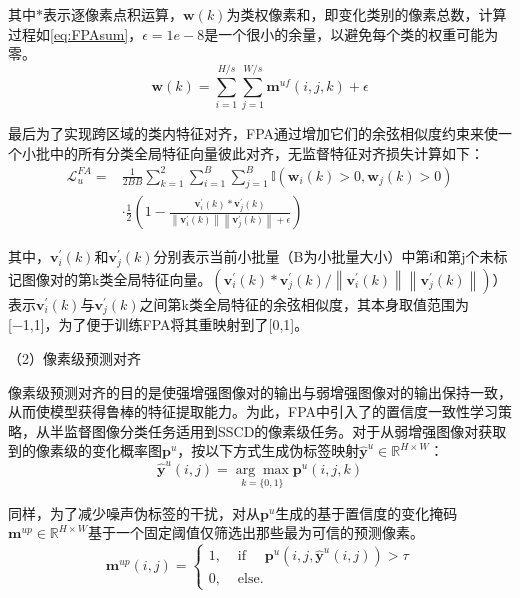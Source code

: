 \documentclass[lang=chs, degree=master, blindreview=false, adobe=false]{yanputhesis}
\begin{document}
其中$*$表示逐像素点积运算，$\boldsymbol{w}(k)$为类权像素和，即变化类别的像素总数，计算过程如\ref{eq:FPAsum}，$\epsilon = 1e-8$是一个很小的余量，以避免每个类的权重可能为零。
\begin{equation}
  \label{eq:FPAsum}
\boldsymbol{w}(k)=\sum_{i=1}^{H / s} \sum_{j=1}^{W / s} \mathbf{m}^{u f}(i, j, k)+\epsilon
\end{equation}

最后为了实现跨区域的类内特征对齐，FPA通过增加它们的余弦相似度约束来使一个小批中的所有分类全局特征向量彼此对齐，无监督特征对齐损失计算如下：
\begin{equation}
  \label{eq:FPALossf}
  \begin{aligned}
    \mathcal{L}_{u}^{F A}= & \frac{1}{2 B B} \sum_{k=1}^{2} \sum_{i=1}^{B} \sum_{j=1}^{B} \mathbb{I}\left(\boldsymbol{w}_{i}(k)>0, \boldsymbol{w}_{j}(k)>0\right) \\
    & \cdot \frac{1}{2}\left(1-\frac{\mathbf{v}_{i}^{\prime}(k) * \mathbf{v}_{j}^{\prime}(k)}{\left\|\mathbf{v}_{i}^{\prime}(k)\right\|\left\|\mathbf{v}_{j}^{\prime}(k)\right\|+\epsilon}\right)
    \end{aligned}
\end{equation}

其中，$\mathbf{v}_{i}^{\prime}(k)$和$\mathbf{v}_{j}^{\prime}(k)$分别表示当前小批量（B为小批量大小）中第i和第j个未标记图像对的第k类全局特征向量。$\left(\mathbf{v}_{i}^{\prime}(k) * \mathbf{v}_{j}^{\prime}(k) /\left\|\mathbf{v}_{i}^{\prime}(k)\right\|\left\|\mathbf{v}_{j}^{\prime}(k)\right\|\right)）$表示$\mathbf{v}_{i}^{\prime}(k)$与$\mathbf{v}_{j}^{\prime}(k)$之间第k类全局特征的余弦相似度，其本身取值范围为[−1,1]，为了便于训练FPA将其重映射到了[0,1]。

（2）像素级预测对齐

像素级预测对齐的目的是使强增强图像对的输出与弱增强图像对的输出保持一致，从而使模型获得鲁棒的特征提取能力。为此，FPA中引入了\cite{sohn2020fixmatch}的置信度一致性学习策略，从半监督图像分类任务适用到SSCD的像素级任务。对于从弱增强图像对获取到的像素级的变化概率图$\mathbf{p}^{u}$，按以下方式生成伪标签映射$\hat{\mathbf{y}}^{u} \in \mathbb{R}^{H \times W}$：
\begin{equation}
  \label{eq:FPApesudo}
  \hat{\mathbf{y}}^{u}(i, j)=\underset{k=\{0,1\}}{\arg \max } \mathbf{p}^{u}(i, j, k)
\end{equation}

同样，为了减少噪声伪标签的干扰，对从$\mathbf{p}^{u}$生成的基于置信度的变化掩码$\mathbf{m}^{u p}\in \mathbb{R}^{H \times W}$基于一个固定阈值仅筛选出那些最为可信的预测像素。
\begin{equation}
  \label{eq:FPAfilter}
  \mathbf{m}^{u p}(i, j)=\left\{\begin{array}{ll}
    1, & \text { if } \quad \mathbf{p}^{u}\left(i, j, \hat{\mathbf{y}}^{u}(i, j)\right)>\tau \\
    0, & \text { else. }
    \end{array}\right.
\end{equation}
\end{document}
